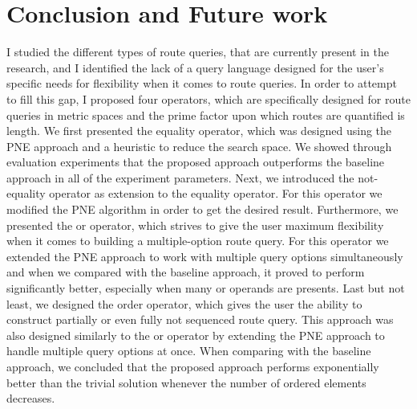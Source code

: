 \chapter{Conclusion and Future work}
\label{sec:conclusion}

I studied the different types of route queries, that are currently present in the research, and I identified the lack of a query language designed for the user's specific needs for flexibility when it comes to route queries. In order to attempt to fill this gap, I proposed four operators, which are specifically designed for route queries in metric spaces and the prime factor upon which routes are quantified is length. 
We first presented the equality operator, which was designed using the PNE approach \cite{OSR} and a heuristic to reduce the search space. We showed through evaluation experiments that the proposed approach outperforms the baseline approach in all of the experiment parameters. Next, we introduced the not-equality operator as extension to the equality operator. For this operator we modified the PNE algorithm in order to get the desired result. Furthermore, we presented the or operator, which strives to give the user maximum flexibility when it comes to building a multiple-option route query. For this operator we extended the PNE approach to work with multiple query options simultaneously and when we compared with the baseline approach, it proved to perform significantly better, especially when many or operands are presents. Last but not least, we designed the order operator, which gives the user the ability to construct partially or even fully not sequenced route query. This approach was also designed similarly to the or operator by extending the PNE approach to handle multiple query options at once. When comparing with the baseline approach, we concluded that the proposed approach performs exponentially better than the trivial solution whenever the number of ordered elements decreases.

